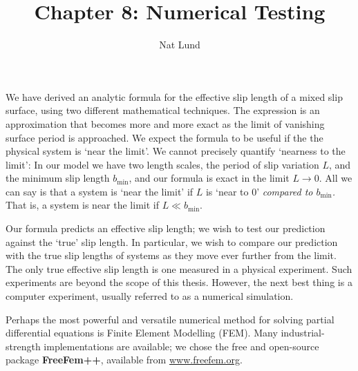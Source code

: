 \documentclass[a4paper]{report}
\title{Chapter 8: Numerical Testing}
\author{Nat Lund}
\newcommand{\bmin}{\ensuremath{b_{\mathrm{min}}}}
\begin{document}
\maketitle

We have derived an analytic formula for the effective slip length of a mixed slip surface, using two different mathematical techniques.  The expression is an approximation that becomes more and more exact as the limit of vanishing surface period is approached.  We expect the formula to be useful if the the physical system is `near the limit'.
We cannot precisely quantify `nearness to the limit': In our model we have two length scales, the period of slip variation $L$, and the minimum slip length $\bmin$, and our formula is exact in the limit $L \to 0$.  All we can say is that a system is `near the limit' if $L$ is `near to 0' \emph{compared to $\bmin$.} That is, a system is near the limit if $L \ll \bmin$.

Our formula predicts an effective slip length; we wish to test our prediction against the `true' slip length. In particular, we wish to compare our prediction with the true slip lengths of systems as they move ever further from the limit.  The only true effective slip length is one measured in a physical experiment.  Such experiments are beyond the scope of this thesis.  However, the next best thing is a computer experiment, usually referred to as a numerical simulation.

Perhaps the most powerful and versatile numerical method for solving partial differential equations is Finite Element Modelling (FEM).  Many industrial-strength implementations are available; we chose the free and open-source package \textbf{FreeFem++}, available from \url{www.freefem.org}.
\end{document}
